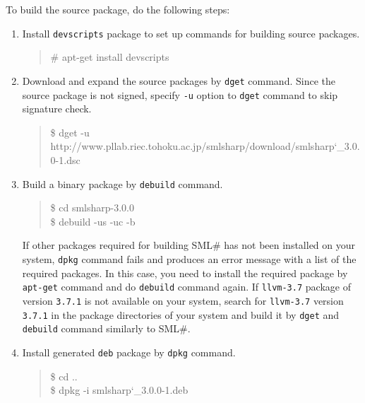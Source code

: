 \documentclass{jbook}
\newcommand{\smlsharp}{SML\#}
\newcommand{\version}{3.0.0}
\newenvironment{program}{\begin{quote}\begin{tt}}%
                        {\end{tt}\end{quote}}
\begin{document}
	To build the source package, do the following steps:
\begin{enumerate}
\item
	Install {\tt devscripts} package to set up commands for building
source packages.
\begin{program}
\# apt-get install devscripts
\end{program}
\item
	Download and expand the source packages by {\tt dget} command.
	Since the source package is not signed,
specify {\tt -u} option to {\tt dget} command to skip signature
check.
\begin{program}
\$ dget -u http://www.pllab.riec.tohoku.ac.jp/smlsharp/download/smlsharp\char`\_\version-1.dsc
\end{program}
\item
	Build a binary package by {\tt debuild} command.
\begin{program}
\$ cd smlsharp-\version\\
\$ debuild -us -uc -b
\end{program}
	If other packages required for building \smlsharp{} has not been
installed on your system, {\tt dpkg} command fails and produces an error
message with a list of the required packages.
	In this case, you need to install the required package by
{\tt apt-get} command and do {\tt debuild} command again.
	If {\tt llvm-3.7} package of version {\tt 3.7.1} is not available
on your system,
search for {\tt llvm-3.7} version {\tt 3.7.1} in the package directories
of your system and build it by {\tt dget} and {\tt debuild} command
similarly to \smlsharp{}.
\item
	Install generated {\tt deb} package by {\tt dpkg} command.
\begin{program}
\$ cd ..\\
\$ dpkg -i smlsharp\char`\_\version-1.deb
\end{program}
\end{enumerate}

\fi%
\end{document}
